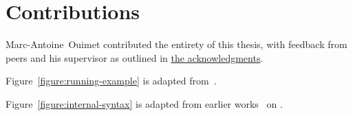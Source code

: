 \chapter*{Contributions}

Marc-Antoine~Ouimet contributed the entirety of this thesis, with feedback from peers and his supervisor as outlined in \hyperref[chapter:acknowledgments]{the acknowledgments}.

\noindent
Figure~\ref{figure:running-example} is adapted from~\cite{felty2010reasoning}.

\noindent
Figure~\ref{figure:internal-syntax} is adapted from earlier works~\cite{nanevski2008contextual, germain2010implementation, cave2013first, ferreira2013compiling} on \Beluga.
